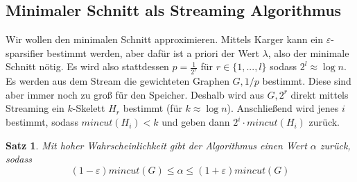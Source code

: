 \documentclass[a4paper, 12pt]{article}
\theoremstyle{plain}
\newtheorem{theorem}{Satz}[subsection] %
\theoremstyle{definition}
\theoremstyle{lemma}
\theoremstyle{remark}
\theoremstyle{corollary}
\theoremstyle{example}
\begin{document}
	\subsection{Minimaler Schnitt als Streaming Algorithmus}
	Wir wollen den minimalen Schnitt approximieren. Mittels Karger kann ein $\varepsilon$-sparsifier bestimmt werden, aber dafür ist a priori der Wert $\lambda$, also der minimale Schnitt nötig. Es wird also stattdessen $p = \frac{1}{2^r}$ für $r \in \{1,...,l\}$ sodass $2^l \approx \log n$. Es werden aus dem Stream die gewichteten Graphen $G,1/p$ bestimmt. Diese sind aber immer noch zu groß für den Speicher. Deshalb wird aus $G,2^r$ direkt mittels Streaming ein $k$-Skelett $H_{r}$ bestimmt (für $k \approx \log n$). Anschließend wird jenes $i$ bestimmt, sodass $mincut(H_i)<k$ und geben dann $2^i \cdot mincut(H_i)$ zurück.
	\begin{theorem}
		Mit hoher Wahrscheinlichkeit gibt der Algorithmus einen Wert $\alpha$ zurück, sodass \[(1-\varepsilon) mincut(G) \leq \alpha \leq (1+\varepsilon)mincut(G)\]
	\end{theorem}
\end{document}
